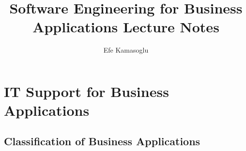 \documentclass[ieeetran]{article}
\title{Software Engineering for Business Applications Lecture Notes}
\author{Efe Kamasoglu}
\begin{document}
\maketitle

\pagebreak

\section{IT Support for Business Applications} %
\label{sec:iT_support_for_business_applications}

\subsection{Classification of Business Applications} %
\label{sub:classification_of_business_applications}
\end{document}
